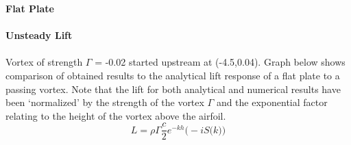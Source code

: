 \documentclass{article}
\begin{document}
\noindent \textbf{Flat Plate} \\ \\
\noindent \textbf{Unsteady Lift}\\ \\
Vortex of strength $\Gamma$ = -0.02 started upstream at (-4.5,0.04). Graph below shows comparison of obtained results to the analytical lift response of a flat plate to a passing vortex. Note that the lift for both analytical and numerical results have been `normalized' by the strength of the vortex $\Gamma$ and the exponential factor relating to the height of the vortex above the airfoil.\\
\begin{equation}
L = \rho \Gamma \frac{c}{2} e^{-kh} \big(-i S\big(k \big) \big)
\end{equation}
\end{document}
